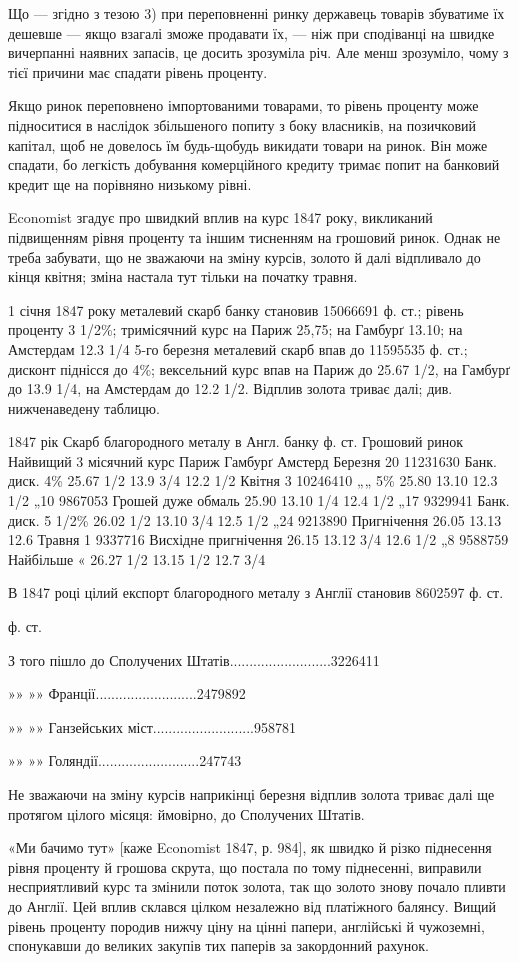 Що — згідно з тезою 3) при переповненні ринку державець товарів збуватиме
їх дешевше — якщо взагалі зможе продавати їх, — ніж при сподіванці на
швидке вичерпанні наявних запасів, це досить зрозуміла річ. Але менш зрозуміло,
чому з тієї причини має спадати рівень проценту.

Якщо ринок переповнено імпортованими товарами, то рівень проценту може
підноситися в наслідок збільшеного попиту з боку власників, на позичковий
капітал, щоб не довелось їм будь-щобудь викидати товари на ринок. Він може
спадати, бо легкість добування комерційного кредиту тримає попит на банковий
кредит ще на порівняно низькому рівні.

Economist згадує про швидкий вплив на курс 1847 року, викликаний
підвищенням рівня проценту та іншим тисненням на грошовий ринок. Однак не
треба забувати, що не зважаючи на зміну курсів, золото й далі відпливало
до кінця квітня; зміна настала тут тільки на початку травня.

1 січня 1847 року металевий скарб банку становив 15066691 ф. ст.;
рівень проценту 3 1/2\%; тримісячний курс на Париж 25,75; на Гамбурґ 13.10;
на Амстердам 12.3 1/4 5-го березня металевий скарб впав до 11595535 ф. ст.;
дисконт піднісся до 4\%; вексельний курс впав на Париж до 25.67 1/2, на Гамбурґ
до 13.9 1/4, на Амстердам до 12.2 1/2. Відплив золота триває далі; див.
нижченаведену таблицю.

1847 рік
Скарб благородного металу в Англ. банку ф. ст.
Грошовий ринок
Найвищий 3 місячний курс
            Париж    Гамбурґ    Амстерд
Березня 20  11231630   Банк. диск. 4\%   25.67 1/2   13.9 3/4  12.2 1/2
Квітня 3  10246410 „„ 5\%   25.80  13.10     12.3   1/2
„10  9867053  Грошей дуже обмаль 25.90   13.10 1/4   12.4 1/2
„17  9329941  Банк. диск.  5 1/2\%    26.02 1/2    13.10 3/4       12.5 1/2
„24  9213890  Пригнічення       26.05   13.13     12.6
Травня 1 9337716 Висхідне пригнічення 26.15      13.12 3/4    12.6 1/2
„8  9588759  Найбільше « 26.27 1/2      13.15 1/2      12.7 3/4

В 1847 році цілий експорт благородного металу з Англії становив
8602597 ф. ст.

ф. ст.

З того пішло до Сполучених Штатів..........................3226411

»»    »» Франції..........................2479892

 »»    »» Ганзейських міст..........................958781

»»    »» Голяндії..........................247743

Не зважаючи на зміну курсів наприкінці березня відплив золота триває
далі ще протягом цілого місяця: ймовірно, до Сполучених Штатів.

«Ми бачимо тут» [каже Economist 1847, р. 984], як швидко й різко піднесення
рівня проценту й грошова скрута, що постала по тому піднесенні, виправили
несприятливий курс та змінили поток золота, так що золото знову почало
пливти до Англії. Цей вплив склався цілком незалежно від платіжного балянсу.
Вищий рівень проценту породив нижчу ціну на цінні папери, англійські й
чужоземні, спонукавши до великих закупів тих паперів за закордонний рахунок.
\parbreak{}  %
